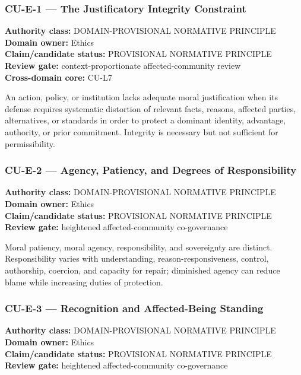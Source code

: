 \documentclass[
  11pt,
]{article}
\begin{document}
\subsubsection{CU-E-1 --- The Justificatory Integrity
Constraint}\label{cu-e-1-the-justificatory-integrity-constraint}

\textbf{Authority class:} DOMAIN-PROVISIONAL NORMATIVE PRINCIPLE\\
\textbf{Domain owner:} Ethics\\
\textbf{Claim/candidate status:} PROVISIONAL NORMATIVE PRINCIPLE\\
\textbf{Review gate:} context-proportionate affected-community review\\
\textbf{Cross-domain core:} CU-L7

An action, policy, or institution lacks adequate moral justification
when its defense requires systematic distortion of relevant facts,
reasons, affected parties, alternatives, or standards in order to
protect a dominant identity, advantage, authority, or prior commitment.
Integrity is necessary but not sufficient for permissibility.

\subsubsection{CU-E-2 --- Agency, Patiency, and Degrees of
Responsibility}\label{cu-e-2-agency-patiency-and-degrees-of-responsibility}

\textbf{Authority class:} DOMAIN-PROVISIONAL NORMATIVE PRINCIPLE\\
\textbf{Domain owner:} Ethics\\
\textbf{Claim/candidate status:} PROVISIONAL NORMATIVE PRINCIPLE\\
\textbf{Review gate:} heightened affected-community co-governance

Moral patiency, moral agency, responsibility, and sovereignty are
distinct. Responsibility varies with understanding,
reason-responsiveness, control, authorship, coercion, and capacity for
repair; diminished agency can reduce blame while increasing duties of
protection.

\subsubsection{CU-E-3 --- Recognition and Affected-Being
Standing}\label{cu-e-3-recognition-and-affected-being-standing}

\textbf{Authority class:} DOMAIN-PROVISIONAL NORMATIVE PRINCIPLE\\
\textbf{Domain owner:} Ethics\\
\textbf{Claim/candidate status:} PROVISIONAL NORMATIVE PRINCIPLE\\
\textbf{Review gate:} heightened affected-community co-governance
\end{document}
